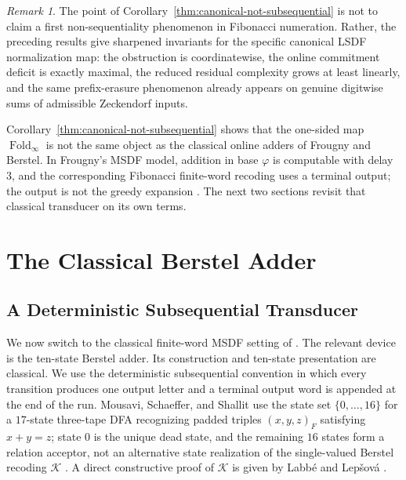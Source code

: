 \documentclass[11pt,letterpaper]{article}
\numberwithin{equation}{section}
\theoremstyle{plain}
\theoremstyle{definition}
\theoremstyle{remark}
\newtheorem{remark}[theorem]{Remark}
\DeclareMathOperator{\Fold}{Fold}
\begin{document}
\begin{remark}\label{rem:frougny-separation}
The point of Corollary~\ref{thm:canonical-not-subsequential} is not to claim a
first non-sequentiality phenomenon in Fibonacci numeration.  Rather, the
preceding results give sharpened invariants for the specific canonical LSDF
normalization map: the obstruction is coordinatewise, the online commitment
deficit is exactly maximal, the reduced residual complexity grows at least
linearly, and the same prefix-erasure phenomenon already appears on genuine
digitwise sums of admissible Zeckendorf inputs.
\par
Corollary~\ref{thm:canonical-not-subsequential} shows that the one-sided map
$\Fold_\infty$ is not the same object as the classical online adders of
Frougny and Berstel.  In Frougny's MSDF model,
addition in base $\varphi$ is computable with delay $3$, and the corresponding
Fibonacci finite-word recoding uses a terminal output; the output is not the
greedy expansion \cite[Prop.~13 and Cor.~4]{Frougny1999OnlineAddition}.  The next two sections
revisit that classical transducer on its own terms.
\end{remark}

\section{The Classical Berstel Adder}\label{sec:kernel}

\subsection{A Deterministic Subsequential Transducer}

We now switch to the classical finite-word MSDF setting of
\cite{Frougny1999OnlineAddition,LabbeLepsova2023FibonacciTwosComplement}.
The relevant device is the ten-state Berstel adder.  Its construction and
ten-state presentation are classical.  We use the deterministic
subsequential convention in which every transition produces one output letter
and a terminal output word is appended at the end of the run.  Mousavi,
Schaeffer, and Shallit use the state set $\{0,\ldots,16\}$ for a $17$-state
three-tape DFA recognizing padded triples $(x,y,z)_F$ satisfying $x+y=z$;
state $0$ is the unique dead state, and the remaining $16$ states form a
relation acceptor, not an alternative state realization of the single-valued
Berstel recoding $\mathcal K$
\cite{MousaviSchaefferShallit2016FibonacciAutomatic}.  A direct constructive
proof of $\mathcal K$ is given by Labb\'e and Lep\v{s}ov\'a
\cite{LabbeLepsova2023FibonacciTwosComplement}.
\end{document}
